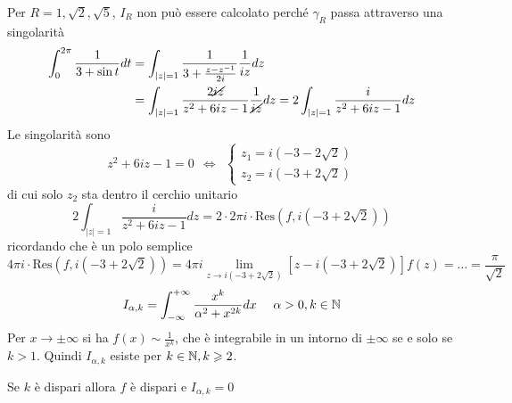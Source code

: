 Per $R=1,\sqrt{2} ,\sqrt{5}$, $I_{R}$ non può essere calcolato perché $\gamma _{R}$ passa attraverso una singolarità
\Soluzione
\begin{align*}
\int ^{2\pi }_{0}\frac{1}{3+\sin t} dt & =\int _{\left| z\right| =1}\frac{1}{3+\frac{z-z^{-1}}{2i}}\frac{1}{iz} dz\\
 & =\int _{\left| z\right| =1}\frac{2\cancel{iz}}{z^{2} +6iz-1}\frac{1}{\cancel{iz}} dz=2\int _{\left| z\right| =1}\frac{i}{z^{2} +6iz-1} dz
\end{align*}
Le singolarità sono
\begin{equation*}
z^{2} +6iz-1=0\ \ \iff \ \ \begin{cases}
z_{1} =i\left( -3-2\sqrt{2}\right)\\
z_{2} =i\left( -3+2\sqrt{2}\right)
\end{cases}
\end{equation*}
di cui solo $z_{2}$ sta dentro il cerchio unitario
\begin{equation*}
2\int _{\left| z\right| =1}\frac{i}{z^{2} +6iz-1} dz=2\cdotp 2\pi i\cdotp \mathrm{Res}\left( f,i\left( -3+2\sqrt{2}\right)\right)
\end{equation*}
ricordando che è un polo semplice
\begin{equation*}
4\pi i\cdotp \mathrm{Res}\left( f,i\left( -3+2\sqrt{2}\right)\right) =4\pi i\lim\limits _{z\rightarrow i\left( -3+2\sqrt{2}\right)}\left[ z-i\left( -3+2\sqrt{2}\right)\right] f\left( z\right) =\dotsc =\frac{\pi }{\sqrt{2}}
\end{equation*}
\Soluzione
\begin{equation*}
I_{\alpha ,k} =\int ^{+\infty }_{-\infty }\frac{x^{k}}{\alpha ^{2} +x^{2k}} dx\ \ \ \ \alpha  >0,k\in \mathbb{N} 
\end{equation*}
Per $x\rightarrow \pm \infty $ si ha $f\left( x\right) \sim \frac{1}{x^{k}}$, che è integrabile in un intorno di $\pm \infty $ se e solo se $k >1$. Quindi $I_{\alpha ,k}$ esiste per $k\in \mathbb{N}  ,k\geqslant 2$.

Se $k$ è dispari allora $f$ è dispari e $I_{\alpha ,k} =0$

